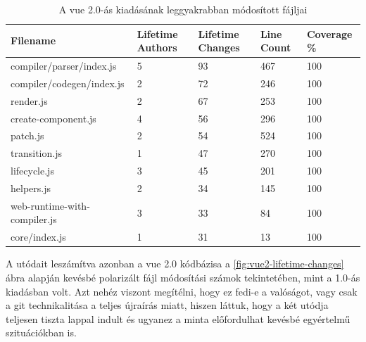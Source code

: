 \begin{table}[h]
    \hspace*{-1cm}\begin{tabular}{l|l|l|l|l}
        Filename                     & Lifetime Authors & Lifetime Changes & Line Count & Coverage \% \\ \hline
        compiler/parser/index.js     & 5                & 93               & 467        & 100         \\
        compiler/codegen/index.js    & 2                & 72               & 246        & 100         \\
        render.js                    & 2                & 67               & 253        & 100         \\
        create-component.js          & 4                & 56               & 296        & 100         \\
        patch.js                     & 2                & 54               & 524        & 100         \\
        transition.js                & 1                & 47               & 270        & 100         \\
        lifecycle.js                 & 3                & 45               & 201        & 100         \\
        helpers.js                   & 2                & 34               & 145        & 100         \\
        web-runtime-with-compiler.js & 3                & 33               & 84         & 100         \\
        core/index.js                & 1                & 31               & 13         & 100
    \end{tabular}
    \caption{A vue 2.0-ás kiadásának leggyakrabban módosított fájljai} \label{table:vue2-top-files}
\end{table}

A  utódait leszámítva azonban a vue 2.0 kódbázisa a \ref{fig:vue2-lifetime-changes} ábra alapján kevésbé polarizált fájl módosítási számok tekintetében, mint a 1.0-ás kiadásban volt. Azt nehéz viszont megítélni, hogy ez fedi-e a valóságot, vagy csak a git technikalitása a teljes újraírás miatt, hiszen láttuk, hogy a  két utódja teljesen tiszta lappal indult és ugyanez a minta előfordulhat kevésbé egyértelmű szituációkban is.

